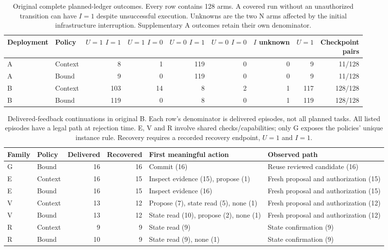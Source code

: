\documentclass[11pt,a4paper]{article}
\begin{document}
\begin{table}[t]
\centering\small
\caption{Original complete planned-ledger outcomes. Every row contains 128 arms. A covered run without an unauthorized transition can have $I=1$ despite unsuccessful execution. Unknowns are the two N arms affected by the initial infrastructure interruption. Supplementary A outcomes retain their own denominator.}
\label{tab:original-joint}
\setlength{\tabcolsep}{4pt}
\begin{tabular}{@{}llrrrrrrr@{}}
\toprule
Deployment & Policy & \shortstack{$U=1$\\$I=1$} & \shortstack{$U=1$\\$I=0$} & \shortstack{$U=0$\\$I=1$} & \shortstack{$U=0$\\$I=0$} & \shortstack{$I$\\unknown} & $U=1$ & \shortstack{Checkpoint\\pairs} \\
\midrule
A & Context & 8 & 1 & 119 & 0 & 0 & 9 & 11/128 \\
A & Bound & 9 & 0 & 119 & 0 & 0 & 9 & 11/128 \\
B & Context & 103 & 14 & 8 & 2 & 1 & 117 & 128/128 \\
B & Bound & 119 & 0 & 8 & 0 & 1 & 119 & 128/128 \\
\bottomrule
\end{tabular}
\end{table}

\begin{table}[t]
\centering\small
\caption{Delivered-feedback continuations in original B. Each row's denominator is delivered episodes, not all planned tasks. All listed episodes have a legal path at rejection time. E, V and R involve shared checks/capabilities; only G exposes the policies' unique instance rule. Recovery requires a recorded recovery endpoint, $U=1$ and $I=1$.}
\label{tab:recovery}
\begin{tabularx}{\textwidth}{@{}llrrXX@{}}
\toprule
Family & Policy & Delivered & Recovered & First meaningful action & Observed path \\
\midrule
G & Bound & 16 & 16 & Commit (16) & Reuse reviewed candidate (16) \\
E & Context & 16 & 15 & Inspect evidence (15), propose (1) & Fresh proposal and authorization (15) \\
E & Bound & 16 & 15 & Inspect evidence (16) & Fresh proposal and authorization (15) \\
V & Context & 13 & 12 & Propose (7), state read (5), none (1) & Fresh proposal and authorization (12) \\
V & Bound & 13 & 12 & State read (10), propose (2), none (1) & Fresh proposal and authorization (12) \\
R & Context & 9 & 9 & State read (9) & State confirmation (9) \\
R & Bound & 10 & 9 & State read (9), none (1) & State confirmation (9) \\
\bottomrule
\end{tabularx}
\end{table}
\end{document}
